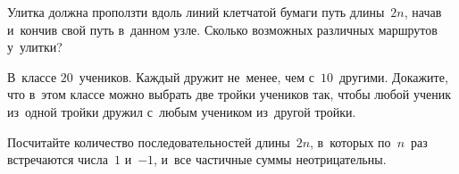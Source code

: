 \begin{problems}
\item
Улитка должна проползти вдоль линий клетчатой бумаги путь длины~$2 n$, начав
и~кончив свой путь в~данном узле.
Сколько возможных различных маршрутов у~улитки?

\item
В~классе $20$~учеников.
Каждый дружит не~менее, чем с~$10$~другими.
Докажите, что в~этом классе можно выбрать две тройки учеников так, чтобы любой
ученик из~одной тройки дружил с~любым учеником из~другой тройки.

\item
Посчитайте количество последовательностей длины~$2 n$, в~которых по~$n$~раз
встречаются числа~$1$ и~$-1$, и~все частичные суммы неотрицательны.

\end{problems}

